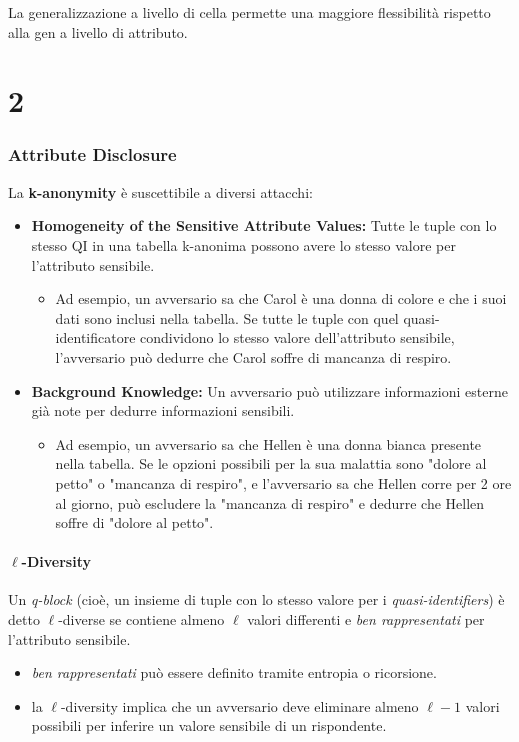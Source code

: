\documentclass{report}
\begin{document}
\noindent La generalizzazione a livello di cella permette una maggiore flessibilità rispetto alla gen a livello di attributo.








\newpage

\chapter{2}


\subsection{Attribute Disclosure}
La \textbf{k-anonymity} è suscettibile a diversi attacchi:

\begin{itemize}
    \item \textbf{Homogeneity of the Sensitive Attribute Values:} 
    Tutte le tuple con lo stesso QI in una tabella k-anonima possono avere lo stesso valore per l'attributo sensibile.
    \begin{itemize}
        \item Ad esempio, un avversario sa che Carol è una donna di colore e che i suoi dati sono inclusi nella tabella. Se tutte le tuple con quel quasi-identificatore condividono lo stesso valore dell'attributo sensibile, l'avversario può dedurre che Carol soffre di mancanza di respiro.
    \end{itemize}
    
    \item \textbf{Background Knowledge:} 
    Un avversario può utilizzare informazioni esterne già note per dedurre informazioni sensibili.
    \begin{itemize}
        \item Ad esempio, un avversario sa che Hellen è una donna bianca presente nella tabella. Se le opzioni possibili per la sua malattia sono "dolore al petto" o "mancanza di respiro", e l'avversario sa che Hellen corre per 2 ore al giorno, può escludere la "mancanza di respiro" e dedurre che Hellen soffre di "dolore al petto".
    \end{itemize}
\end{itemize}

\subsubsection{\texorpdfstring{$\ell$}{l}-Diversity}
Un \textit{q-block} (cioè, un insieme di tuple con lo stesso valore per i \textit{quasi-identifiers}) è detto $\ell$-diverse se contiene almeno $\ell$ valori differenti e \textit{ben rappresentati} per l'attributo sensibile. 
\begin{itemize}
    \item \textit{ben rappresentati} può essere definito tramite entropia o ricorsione. 
    \item la $\ell$-diversity implica che un avversario deve eliminare almeno $\ell-1$ valori possibili per inferire un valore sensibile di un rispondente.
\end{itemize}
\end{document}
